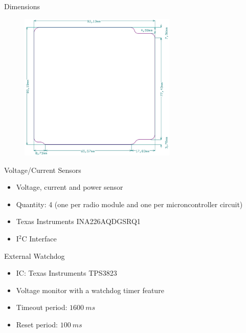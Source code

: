 \begin{frame}{Dimensions}

    \begin{figure}[!ht]
        \begin{center}
            \includegraphics[width=7.5cm]{figures/board-dimensions.png}
        \end{center}
    \end{figure}

\end{frame}

\begin{frame}{Voltage/Current Sensors}

    \begin{itemize}
        \item Voltage, current and power sensor
        \vspace{0.3cm}
        \item Quantity: 4 (one per radio module and one per microncontroller circuit)
        \vspace{0.3cm}
        \item Texas Instruments INA226AQDGSRQ1
        \vspace{0.3cm}
        \item I$^{2}$C Interface
        \vspace{0.3cm}
    \end{itemize}


\end{frame}

\begin{frame}{External Watchdog}

    \begin{itemize}
        \item IC: Texas Instruments TPS3823
        \vspace{0.5cm}
        \item Voltage monitor with a watchdog timer feature
        \vspace{0.5cm}
        \item Timeout period: $1600\ ms$
        \vspace{0.5cm}
        \item Reset period: $100\ ms$
    \end{itemize}

\end{frame}

